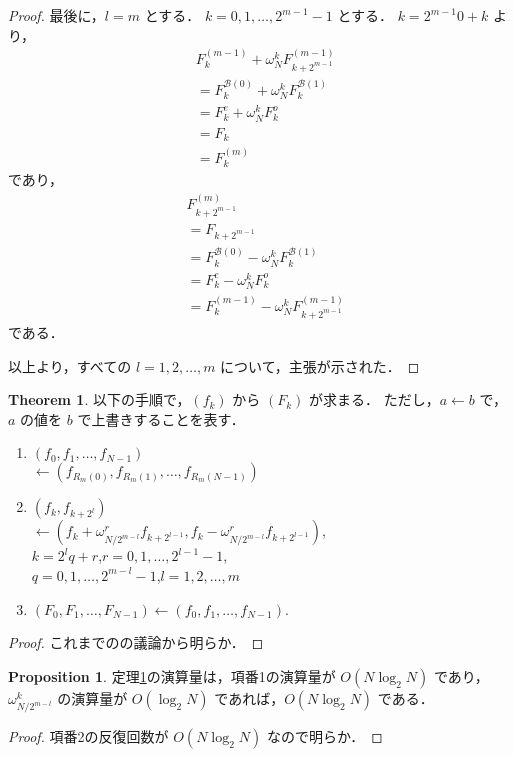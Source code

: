 \documentclass[twocolumn, uplatex, dvipdfmx]{jsarticle}
\numberwithin{equation}{section}
\theoremstyle{definition}
\newtheorem{prop}{Proposition}[section]
\newtheorem{thm}{Theorem}[section]
\begin{document}
\begin{proof}
	最後に，$l=m$ とする．
	$k=0,1,\dots,2^{m-1}-1$ とする．
	$k=2^{m-1}0+k$ より，
	\begin{align*}
		&F_k^{(m-1)}+\omega_N^kF_{k+2^{m-1}}^{(m-1)}\\
		&=F_k^{\mathcal{B}(0)}+\omega_N^kF_k^{\mathcal{B}(1)}\\
		&=F_k^e+\omega_N^kF_k^o\\
		&=F_k\\
		&=F_k^{(m)}
	\end{align*}
	であり，
	\begin{align*}
		&F_{k+2^{m-1}}^{(m)}\\
		&=F_{k+2^{m-1}}\\
		&=F_k^{\mathcal{B}(0)}-\omega_N^kF_k^{\mathcal{B}(1)}\\
		&=F_k^e-\omega_N^kF_k^o\\
		&=F_k^{(m-1)}-\omega_N^kF_{k+2^{m-1}}^{(m-1)}
	\end{align*}
	である．

	以上より，すべての $l=1,2,\dots,m$ について，主張が示された．
\end{proof}

\begin{thm}\label{thm:ntt}
	以下の手順で，$(f_k)$ から $(F_k)$ が求まる．
	ただし，$a\leftarrow b$ で，$a$ の値を $b$ で上書きすることを表す．
	\begin{enumerate}
		\item $(f_0,f_1,\dots,f_{N-1})$\\
			\quad$\leftarrow (f_{R_m(0)},f_{R_m(1)},\dots,f_{R_m(N-1)})$
		\item $(f_k,f_{k+2^l})$\\
			\quad$\leftarrow (f_k+\omega_{N/2^{m-l}}^rf_{k+2^{l-1}},f_k-\omega_{N/2^{m-l}}^rf_{k+2^{l-1}})$,\\
			$k=2^lq+r$,\quad $r=0,1,\dots,2^{l-1}-1$,\\
			$q=0,1,\dots,2^{m-l}-1$,\quad $l=1,2,\dots,m$
		\item $(F_0,F_1,\dots,F_{N-1})\leftarrow (f_0,f_1,\dots,f_{N-1})$.
	\end{enumerate}
\end{thm}
\begin{proof}
	これまでのの議論から明らか．
\end{proof}

\begin{prop}
	定理\ref{thm:ntt}の演算量は，項番1の演算量が $O(N\log_2N)$ であり，$\omega_{N/2^{m-l}}^k$ の演算量が $O(\log_2N)$ であれば，$O(N\log_2N)$ である．
\end{prop}
\begin{proof}
	項番2の反復回数が $O(N\log_2N)$ なので明らか．
\end{proof}
\end{document}
